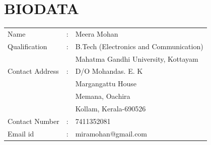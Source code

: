 \documentclass[a4paper,12pt]{report}
\begin{document}
\section*{\centering BIODATA}
\begin{tabular}{lll}
Name			&:	&Meera Mohan			\\

Qualification 		&:	&B.Tech (Electronics and Communication)	\\

			&	&Mahatma Gandhi University, Kottayam			\\

Contact Address 	&:	&D/O Mohandas. E. K			\\
		
			&	&Margangattu House		\\
		
			&	&Memana, Oachira		\\

			&	&Kollam, Kerala-690526		\\

Contact Number  	&:	&7411352081				\\

Email id		&:	&miramohan@gmail.com			\\

\end{tabular}



\end{document}
